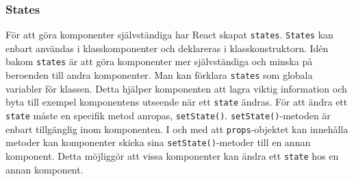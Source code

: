 \subsubsection{States}
\label{axel:react-states} 
För att göra komponenter självständiga har React skapat \texttt{states}.\cite{react-states} \texttt{States} kan enbart användas i klasskomponenter och deklareras i klasskonstruktorn. Idén bakom \texttt{states} är att göra komponenter mer självständiga och minska på beroenden till andra komponenter. Man kan förklara \texttt{states} som globala variabler för klassen. Detta hjälper komponenten att lagra viktig information och byta till exempel komponentens utseende när ett \texttt{state} ändras. För att ändra ett \texttt{state} måste en specifik metod anropas, \texttt{setState()}. \texttt{setState()}-metoden är enbart tillgänglig inom komponenten. I och med att \texttt{props}-objektet kan innehålla metoder kan komponenter skicka sina \texttt{setState()}-metoder till en annan komponent. Detta möjliggör att vissa komponenter kan ändra ett \texttt{state} hos en annan komponent.


